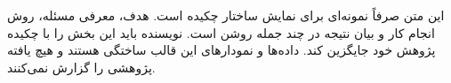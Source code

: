 این متن صرفاً نمونه‌ای برای نمایش ساختار چکیده است. هدف، معرفی مسئله، روش انجام کار و بیان نتیجه در چند جمله روشن است. نویسنده باید این بخش را با چکیده پژوهش خود جایگزین کند. داده‌ها و نمودارهای این قالب ساختگی هستند و هیچ یافته پژوهشی را گزارش نمی‌کنند.
